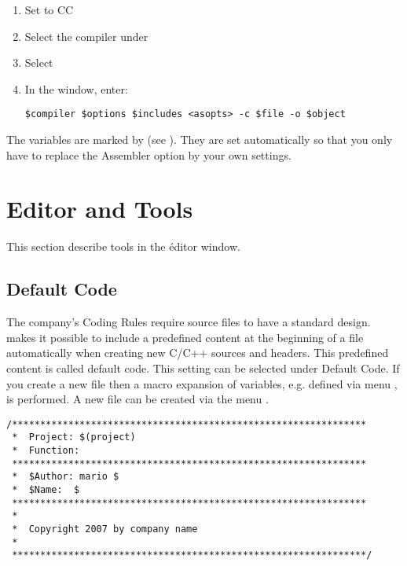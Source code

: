 \begin{enumerate}
\item Set  to CC
\item Select the compiler under 
\item Select 
\item In the window, enter:
\begin{lstlisting}
$compiler $options $includes <asopts> -c $file -o $object
\end{lstlisting}
\end{enumerate}

The \codeblocks variables are marked by \codeline{$} (see ). They are set automatically so that you only have to replace the Assembler option  by your own settings.

\section{Editor and Tools}

This section describe tools in the éditor window.

\subsection{Default Code}

The company's Coding Rules require source files to have a standard design. \codeblocks makes it possible to include a predefined content at the beginning of a file automatically when creating new C/C++ sources and headers. This predefined content is called default code. This setting can be selected under  Default Code. If you create a new file then a macro expansion of variables, e.g. defined via menu ,  is performed. A new file can be created via the menu .


\begin{lstlisting}
/***************************************************************
 *  Project: $(project)
 *  Function:
 ***************************************************************
 *  $Author: mario $
 *  $Name:  $
 ***************************************************************
 *
 *  Copyright 2007 by company name
 *
 ***************************************************************/
\end{lstlisting}

